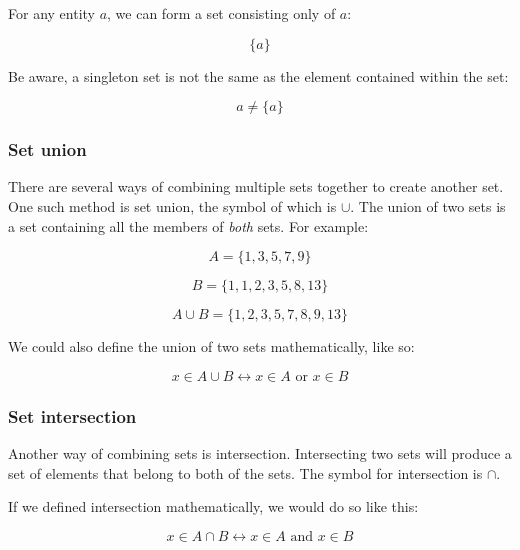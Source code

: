 For any entity $a$, we can form a set consisting only of $a$:

\begin{dmath}
	\{a\}
\end{dmath}

Be aware, a singleton set is not the same as the element contained within the
set:

\begin{dmath}
	a \neq \{a\}
\end{dmath}

\subsubsection{Set union}

There are several ways of combining multiple sets together to create another
set. One such method is set union, the symbol of which is $\cup$. The union of
two sets is a set containing all the members of {\it both} sets. For example:

\begin{dmath}
	A = \{1, 3, 5, 7, 9\}
\end{dmath}

\begin{dmath}
 	B = \{1, 1, 2, 3, 5, 8, 13\}
\end{dmath}

\begin{dmath}
	A \cup B = \{1, 2, 3, 5, 7, 8, 9, 13\}
\end{dmath}

We could also define the union of two sets mathematically, like so:

\begin{dmath}
	{x \in A \cup B \leftrightarrow x \in A \textrm{ or } x \in B}
\end{dmath}

\subsubsection{Set intersection}

Another way of combining sets is intersection. Intersecting two sets will
produce a set of elements that belong to both of the sets. The symbol for
intersection is $\cap$.

If we defined intersection mathematically, we would do so like this:

\begin{dmath}
	{x \in A \cap B \leftrightarrow x \in A \textrm{ and } x \in B}
\end{dmath}

